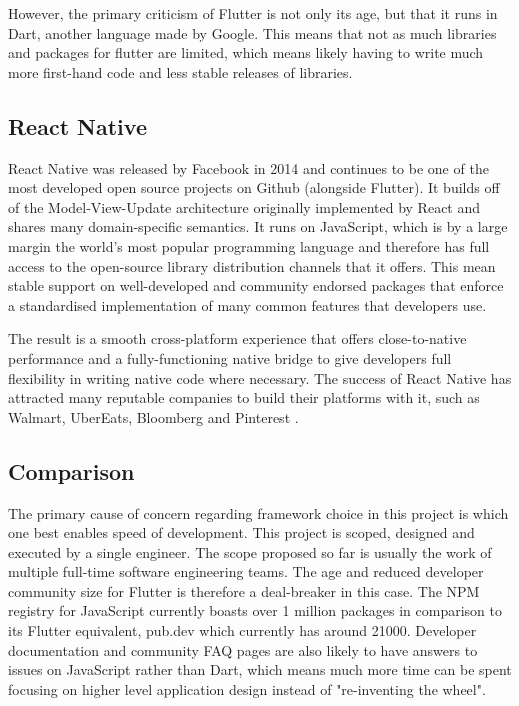 However, the primary criticism of Flutter is not only its age, but that it runs in Dart, another language made by Google. This means that not as much libraries and packages for flutter are limited, which means likely having to write much more first-hand code and less stable releases of libraries.

\subsection{React Native}
React Native was released by Facebook in 2014 and continues to be one of the most developed open source projects on Github (alongside Flutter). It builds off of the Model-View-Update architecture originally implemented by React and shares many domain-specific semantics. It runs on JavaScript, which is by a large margin the world's most popular programming language \cite{sfdevsurvey} and therefore has full access to the open-source library distribution channels that it offers. This mean stable support on well-developed and community endorsed packages that enforce a standardised implementation of many common features that developers use.

The result is a smooth cross-platform experience that offers close-to-native performance and a fully-functioning native bridge to give developers full flexibility in writing native code where necessary. The success of React Native has attracted many reputable companies to build their platforms with it, such as Walmart, UberEats, Bloomberg and Pinterest \cite{rnplatforms}.

\subsection{Comparison}
The primary cause of concern regarding framework choice in this project is which one best enables speed of development. This project is scoped, designed and executed by a single engineer. The scope proposed so far is usually the work of multiple full-time software engineering teams. The age and reduced developer community size for Flutter is therefore a deal-breaker in this case. The NPM registry for JavaScript currently boasts over 1 million packages in comparison to its Flutter equivalent, pub.dev which currently has around 21000. Developer documentation and community FAQ pages are also likely to have answers to issues on JavaScript rather than Dart, which means much more time can be spent focusing on higher level application design instead of "re-inventing the wheel".

